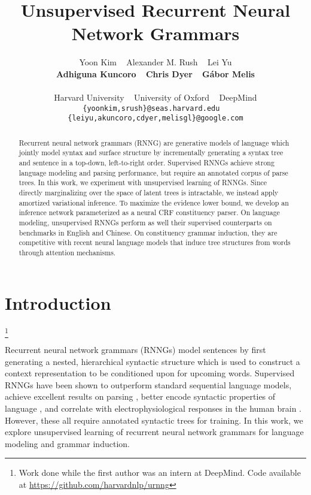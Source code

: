 \documentclass[11pt,a4paper]{article}
\title{Unsupervised Recurrent Neural Network Grammars}
\author{Yoon Kim ~ Alexander M. Rush  ~ Lei Yu  \\  \textbf{Adhiguna Kuncoro} ~  \textbf{Chris Dyer} ~ \textbf{G\'{a}bor Melis} \\ 
\\
 Harvard University ~
University of Oxford ~
DeepMind \\
 {\small \tt \{yoonkim,srush\}@seas.harvard.edu ~  \tt \{leiyu,akuncoro,cdyer,melisgl\}@google.com}}
\date{}
\newcommand\blfootnote[1]{\begingroup
  \renewcommand\thefootnote{}\footnote{#1}\addtocounter{footnote}{-1}\endgroup
}
\begin{document}
\maketitle
\begin{abstract}
  Recurrent neural network grammars (RNNG) are generative models of
  language which jointly model syntax and surface structure by
  incrementally generating a syntax tree and sentence in a top-down,
  left-to-right order. Supervised RNNGs achieve strong language
  modeling and parsing performance, but require an annotated corpus of
  parse trees. In this work, we experiment with unsupervised learning
  of RNNGs. Since directly marginalizing over the space of latent
  trees is intractable, we instead apply amortized variational
  inference. To maximize the evidence lower bound, we develop an
  inference network parameterized as a neural CRF constituency parser.
  On language modeling, unsupervised RNNGs perform as well their
  supervised counterparts on benchmarks in English and Chinese. On
  constituency grammar induction, they are competitive with
  recent neural language models that induce tree structures
  from words through attention mechanisms. \vspace{-2mm}
\end{abstract}

\section{Introduction}
\vspace{-2mm}

\blfootnote{\noindent \hspace{-6mm} Work done while  the first author was an intern at DeepMind.  Code available at \url{https://github.com/harvardnlp/urnng}}
Recurrent neural network grammars (RNNGs) \cite{dyer2016rnng} model
sentences by first generating a nested, hierarchical syntactic
structure which is used to construct a context representation to be conditioned upon for upcoming words. Supervised RNNGs
have been shown to outperform standard sequential language models, achieve excellent results on parsing
\cite{dyer2016rnng,kuncoro2017rnng}, better encode syntactic
properties of language \cite{kuncoro2018syntax}, and correlate with
electrophysiological responses in the human brain
\cite{hale2018human}. However, these all require annotated syntactic trees
for training. In this work, we explore unsupervised learning of
recurrent neural network grammars for language modeling and grammar
induction.
\end{document}
